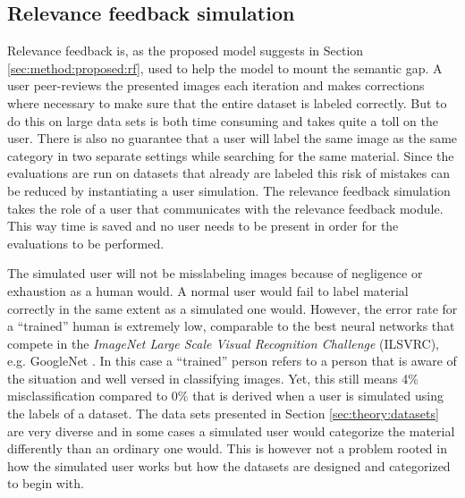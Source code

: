\subsection{Relevance feedback simulation}
\label{sec:method:rf_simulation}
Relevance feedback is, as the proposed model suggests in Section \ref{sec:method:proposed:rf}, used to help the model to mount the semantic gap. A user peer-reviews the presented images each iteration and makes corrections where necessary to make sure that the entire dataset is labeled correctly. But to do this on large data sets is both time consuming and takes quite a toll on the user. There is also no guarantee that a user will label the same image as the same category in two separate settings while searching for the same material. 
Since the evaluations are run on datasets that already are labeled this risk of mistakes can be reduced by instantiating a user simulation. The relevance feedback simulation takes the role of a user that communicates with the relevance feedback module. This way time is saved and no user needs to be present in order for the evaluations to be performed.  

The simulated user will not be misslabeling images because of negligence or exhaustion as a human would. 
A normal user would fail to label material correctly in the same extent as a simulated one would. 
However, the error rate for a ``trained'' human is extremely low, comparable to the best neural networks that compete in the \emph{ImageNet Large Scale Visual Recognition Challenge} (ILSVRC), e.g. GoogleNet \cite{ImageNetChallenge}. 
In this case a ``trained'' person refers to a person that is aware of the situation and well versed in classifying images. Yet, this still means 4\% misclassification compared to 0\% that is derived when a user is simulated using the labels of a dataset.
The data sets presented in Section \ref{sec:theory:datasets} are very diverse and in some cases a simulated user would categorize the material differently than an ordinary one would. This is however not a problem rooted in how the simulated user works but how the datasets are designed and categorized to begin with.
